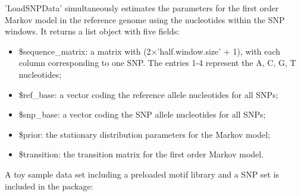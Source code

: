 \documentclass[a4paper,10pt]{article}
\begin{document}
'LoadSNPData' simultaneously estimates the parameters for the first order Markov model in the reference genome using the nucleotides within the SNP windows. It returns a list object with five fields:

\begin{itemize}
\item \$sequence\_matrix: a matrix with (2$\times$'half.window.size' + 1), with each column corresponding to one SNP. The entries 1-4 represent the A, C, G, T nucleotides;
\item \$ref\_base: a vector coding the reference allele nucleotides for all SNPs;
\item \$snp\_base: a vector coding the SNP allele nucleotides for all SNPs;
\item \$prior: the stationary distribution parameters for the Markov model;
\item \$transition: the transition matrix for the first order Markov model.
\end{itemize}

A toy sample data set including a preloaded motif library and a SNP set is included in the package:
\end{document}
